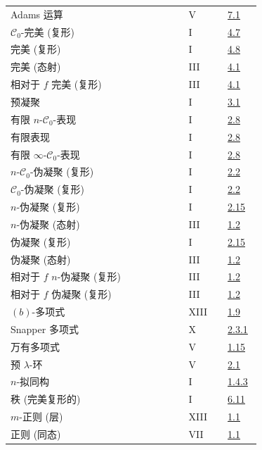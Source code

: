 \begin{longtable}{@{}>{\raggedright\arraybackslash}p{0.64\linewidth}>{\raggedright\arraybackslash}p{0.14\linewidth}>{\raggedright\arraybackslash}p{0.12\linewidth}@{}}
Adams 运算 & V & \hyperlink{sga6.e05.para.7-1}{7.1}\\
\(\mathcal C_0\)-完美 (复形) & I & \hyperlink{sga6.e01.def.4-7}{4.7}\\
完美 (复形) & I & \hyperlink{sga6.e01.ex.4-8}{4.8}\\
完美 (态射) & III & \hyperlink{sga6.e03.def.4-1}{4.1}\\
相对于 \(f\) 完美 (复形) & III & \hyperlink{sga6.e03.def.4-1}{4.1}\\
预凝聚 & I & \hyperlink{sga6.e01.def.3-1}{3.1}\\
有限 \(n\)-\(\mathcal C_0\)-表现 & I & \hyperlink{sga6.e01.def.2-8}{2.8}\\
有限表现 & I & \hyperlink{sga6.e01.def.2-8}{2.8}\\
有限 \(\infty\)-\(\mathcal C_0\)-表现 & I & \hyperlink{sga6.e01.def.2-8}{2.8}\\
\(n\)-\(\mathcal C_0\)-伪凝聚 (复形) & I & \hyperlink{sga6.e01.prop.2-2}{2.2}\\
\(\mathcal C_0\)-伪凝聚 (复形) & I & \hyperlink{sga6.e01.prop.2-2}{2.2}\\
\(n\)-伪凝聚 (复形) & I & \hyperlink{sga6.e01.ex.2-15}{2.15}\\
\(n\)-伪凝聚 (态射) & III & \hyperlink{sga6.e03.def.1-2}{1.2}\\
伪凝聚 (复形) & I & \hyperlink{sga6.e01.ex.2-15}{2.15}\\
伪凝聚 (态射) & III & \hyperlink{sga6.e03.def.1-2}{1.2}\\
相对于 \(f\) \(n\)-伪凝聚 (复形) & III & \hyperlink{sga6.e03.def.1-2}{1.2}\\
相对于 \(f\) 伪凝聚 (复形) & III & \hyperlink{sga6.e03.def.1-2}{1.2}\\
\((b)\)-多项式 & XIII & \hyperlink{sga6.e13.def.1-9}{1.9}\\
Snapper 多项式 & X & \hyperlink{sga6.e10.prop.2-3-1}{2.3.1}\\
万有多项式 & V & \hyperlink{sga6.e05.para.1-15}{1.15}\\
预 \(\lambda\)-环 & V & \hyperlink{sga6.e05.def.2-1}{2.1}\\
\(n\)-拟同构 & I & \hyperlink{sga6.e01.def.1-4-3}{1.4.3}\\
秩 (完美复形的) & I & \hyperlink{sga6.e01.def.6-11}{6.11}\\
\(m\)-正则 (层) & XIII & \hyperlink{sga6.e13.def.1-1}{1.1}\\
正则 (同态) & VII & \hyperlink{sga6.e07.def.1-1}{1.1}\\

\end{longtable}
